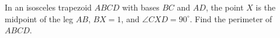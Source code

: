 In an isosceles trapezoid $ABCD$ with bases $BC$ and $AD$, the point $X$ is the midpoint of the leg $AB$, $BX=1$, and $\angle CXD=90^\circ$. Find the perimeter of $ABCD$.
